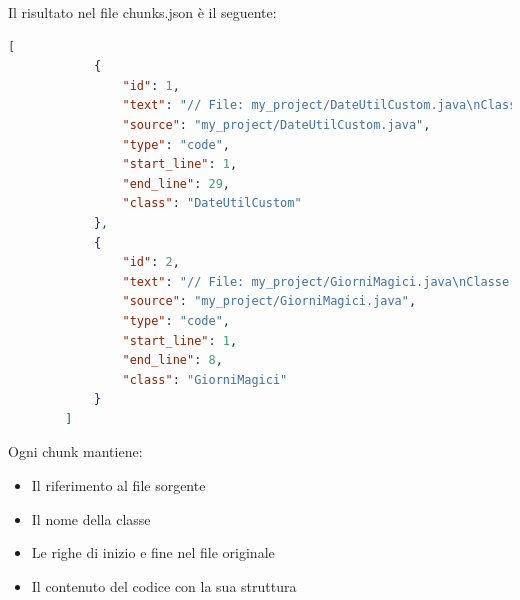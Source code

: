 \documentclass[12pt,a4paper,openright,twoside]{book}
\begin{document}
    Il risultato nel file chunks.json è il seguente:
    \begin{lstlisting}[language=json,firstnumber=1, caption={Esempio di chunks generati}, label={lst:chunks-example}]
        [
            {
                "id": 1,
                "text": "// File: my_project/DateUtilCustom.java\nClasse: DateUtilCustom\npublic class DateUtilCustom {\n    public static String getMessaggioMagico(LocalDate datamagica) throws DateTimeParseException {\n        DayOfWeek giornoSettimana = datamagica.getDayOfWeek();\n        switch(giornoSettimana) {\n            case MONDAY: return \"La magia inizia nel silenzio...\";\n            case TUESDAY: return \"I sussurri degli antichi si fanno sentire.\";\n            case WEDNESDAY: return \"Il velo tra i mondi e' sottile oggi.\";\n            case THURSDAY: return \"L'energia magica e' potente e chiara.\";\n            case FRIDAY: return \"Attenzione agli incantesimi del crepuscolo.\";\n            case SATURDAY: return \"Il giorno perfetto per scoprire segreti nascosti.\";\n            case SUNDAY: return \"Riposa e rigenera il tuo potere magico.\";\n            default: return \"Il giorno e' avvolto nel mistero...\";\n        }\n    }\n}",
                "source": "my_project/DateUtilCustom.java",
                "type": "code",
                "start_line": 1,
                "end_line": 29,
                "class": "DateUtilCustom"
            },
            {
                "id": 2,
                "text": "// File: my_project/GiorniMagici.java\nClasse: GiorniMagici\npublic class GiorniMagici {\n    public static String segnaleWow(LocalDate data) {\n        String wow = \"il tuo segnale Wow e': \" + DateUtilCustom.getMessaggioMagico(date);\n        return wow;\n    }\n}",
                "source": "my_project/GiorniMagici.java",
                "type": "code",
                "start_line": 1,
                "end_line": 8,
                "class": "GiorniMagici"
            }
        ]
        \end{lstlisting}
        
        Ogni chunk mantiene:
        \begin{itemize}
            \item Il riferimento al file sorgente
            \item Il nome della classe
            \item Le righe di inizio e fine nel file originale
            \item Il contenuto del codice con la sua struttura
        \end{itemize}
\end{document}
